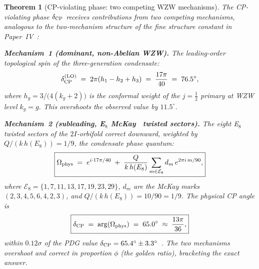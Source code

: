 \documentclass[11pt,a4paper]{article}
\newtheorem{theorem}{Theorem}[section]
\theoremstyle{definition}
\theoremstyle{remark}
\begin{document}
\begin{theorem}[CP-violating phase: two competing WZW mechanisms]
\label{P5:thm:delta_cp}
The CP-violating phase $\delta_{\rm CP}$ receives contributions from two
competing mechanisms, analogous to the two-mechanism structure of the fine
structure constant in Paper~IV~\cite{Paper4}:

\noindent\textbf{Mechanism~1 (dominant, non-Abelian WZW).}
The leading-order topological spin of the three-generation condensate:
\begin{equation}
  \delta_{\rm CP}^{\rm(LO)}
  \;=\; 2\pi(h_1 - h_2 + h_3)
  \;=\; \frac{17\pi}{40}
  \;=\; 76.5^\circ,
  \label{P5:eq:delta_cp_lo}
\end{equation}
where $h_g = 3/\bigl(4(k_g+2)\bigr)$ is the conformal weight of the
$j=\tfrac{1}{2}$ primary at WZW level $k_g = g$.
This \emph{overshoots} the observed value by $11.5^\circ$.

\noindent\textbf{Mechanism~2 (subleading, E$_8$ McKay~\cite{McKay1980} twisted sectors).}
The eight E$_8$ twisted sectors of the $2I$-orbifold correct downward,
weighted by $Q/(k\,h(E_8)) = 1/9$, the condensate phase quantum:
\begin{equation}
  \boxed{\Omega_{\rm phys}
  \;=\; e^{i\cdot17\pi/40}
  \;+\; \frac{Q}{k\,h(E_8)}
        \sum_{m\in\mathcal{E}_8}
        d_m\,e^{2\pi i\,m/90},}
  \label{P5:eq:Omega_NLO}
\end{equation}
where $\mathcal{E}_8 = \{1,7,11,13,17,19,23,29\}$, $d_m$ are the McKay
marks $(2,3,4,5,6,4,2,3)$, and $Q/(k\,h(E_8)) = 10/90 = 1/9$.
The physical CP angle is
\begin{equation}
  \boxed{\delta_{\rm CP}
  \;=\; \arg(\Omega_{\rm phys})
  \;=\; 65.0^\circ
  \;\approx\;\frac{13\pi}{36},}
  \label{P5:eq:delta_cp_NLO}
\end{equation}
within $0.12\sigma$ of the PDG value
$\delta_{\rm CP} = 65.4^\circ\pm3.3^\circ$~\cite{PDG2024}.
The two mechanisms overshoot and correct in proportion $\phi$ (the golden
ratio), bracketing the exact answer.
\end{theorem}
\end{document}
